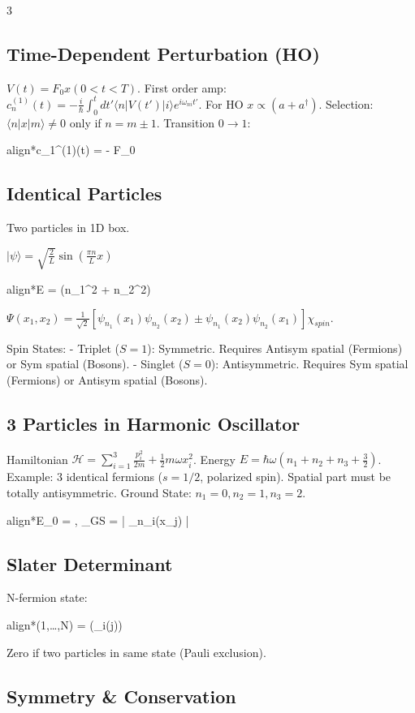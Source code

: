 \documentclass[10pt,a4paper]{article}
\newcommand{\important}[1]{\begin{empheq}[box=\fbox]{align*}#1\end{empheq}}
\begin{document}
\begin{multicols*}{3}



\subsection*{Time-Dependent Perturbation (HO)}
$V(t) = F_0 x (0 < t < T)$.
First order amp: $c_n^{(1)}(t) = -\frac{i}{\hbar} \int_0^t dt' \langle n | V(t') | i \rangle e^{i\omega_{ni}t'}$.
For HO $x \propto (a + a^\dagger)$. Selection: $\langle n | x | m \rangle \neq 0$ only if $n = m \pm 1$.
Transition $0 \to 1$:
\important{c_1^{(1)}(t) = - F_0 \sqrt{\frac{\hbar}{2m\omega}} \frac{e^{i\omega t}-1}{i\omega}}

\subsection*{Identical Particles}
Two particles in 1D box. 

$|\psi\rangle=\sqrt{\frac{2}{L}}\sin(\frac{\pi n}{L}x)$

\important{E = (n_1^2 + n_2^2)}
$\Psi(x_1, x_2) = \frac{1}{\sqrt{2}} [\psi_{n_1}(x_1)\psi_{n_2}(x_2) \pm \psi_{n_1}(x_2)\psi_{n_2}(x_1)] \chi_{spin}$.

Spin States:
- Triplet ($S=1$): Symmetric. Requires Antisym spatial (Fermions) or Sym spatial (Bosons).
- Singlet ($S=0$): Antisymmetric. Requires Sym spatial (Fermions) or Antisym spatial (Bosons).

\subsection*{3 Particles in Harmonic Oscillator}
Hamiltonian $\mathcal{H} = \sum_{i=1}^3 \frac{p_i^2}{2m} + \frac{1}{2}m\omega x_i^2$.
Energy $E = \hbar\omega(n_1+n_2+n_3 + \frac{3}{2})$.
Example: 3 identical fermions ($s=1/2$, polarized spin). Spatial part must be totally antisymmetric.
Ground State: $n_1=0, n_2=1, n_3=2$.
\important{E_0 = \hbar\omega, \quad \Psi_{GS} = \frac{1}{\sqrt{3!}} \det | \psi_{n_i}(x_j) |}

\subsection*{Slater Determinant}
N-fermion state:
\important{\Psi(1,\dots,N) =  \det(\psi_i(j))}
Zero if two particles in same state (Pauli exclusion).

\subsection*{Symmetry \& Conservation}


\end{multicols*}
\end{document}
